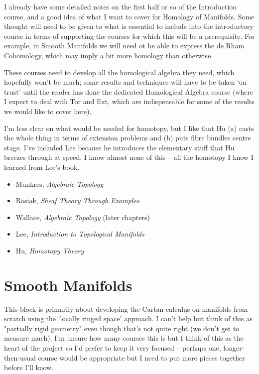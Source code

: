 \documentclass[article]{article}
\begin{document}
I already have some detailed notes on the first half or so of the Introduction course, and a good idea of what I want to cover for Homology of Manifolds. Some thought will need to be given to what is essential to include into the introductory course in terms of supporting the courses for which this will be a prerequisite. For example, in Smooth Manifolds we will need ot be able to express the de Rham Cohomology, which may imply a bit more homology than otherwise.

These courses need to develop all the homological algebra they need, which hopefully won't be much; some results and techniques will have to be taken `on trust' until the reader has done the dedicated Homological Algebra course (where I expect to deal with Tor and Ext, which are indispensable for some of the results we would like to cover here).

I'm less clear on what would be needed for homotopy, but I like that Hu (a) casts the whole thing in terms of extension problems and (b) puts fibre bundles centre stage. I've included Lee because he introduces the elementary stuff that Hu breezes through at speed. I know almost none of this -- all the homotopy I know I learned from Lee's book.

\begin{itemize}
	\item[]{Munkres, \textit{Algebraic Topology}}
	\item[]{Rosiak, \textit{Sheaf Theory Through Examples}}
	\item[]{Wallace, \textit{Algebraic Topology} (later chapters)}
	\item[]{Lee, \textit{Introduction to Topological Manifolds}}
	\item[]{Hu, \textit{Homotopy Theory}}
\end{itemize}

\section{Smooth Manifolds}

This block is primarily about developing the Cartan calculus on manifolds from scratch using the `locally ringed space' approach. I can't help but think of this as "partially rigid geometry" even though that's not quite right (we don't get to measure much). I'm unsure how many courses this is but I think of this as the heart of the project so I'd prefer to keep it very focused -- perhaps one, longer-then-usual course would be appropriate but I need to put more pieces together before I'll know.
\end{document}
